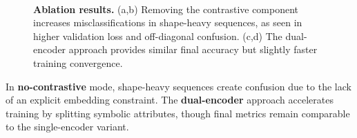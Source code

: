 \documentclass{article} %
\theoremstyle{plain}
\theoremstyle{definition}
\theoremstyle{remark}
\begin{document}
\begin{figure}[h!]
\centering
{}
\\
\caption{\textbf{Ablation results.} (a,b) Removing the contrastive component increases misclassifications in shape-heavy sequences, as seen in higher validation loss and off-diagonal confusion. (c,d) The dual-encoder approach provides similar final accuracy but slightly faster training convergence.}
\label{fig:ablation_summary}
\end{figure}

In \textbf{no-contrastive} mode, shape-heavy sequences create confusion due to the lack of an explicit embedding constraint. The \textbf{dual-encoder} approach accelerates training by splitting symbolic attributes, though final metrics remain comparable to the single-encoder variant.
\end{document}
